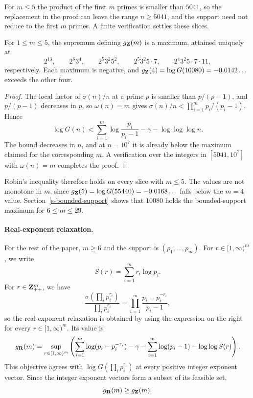 For \(m\leq5\) the product of the first \(m\) primes is smaller than
\(5041\), so the replacement in the proof can leave the range
\(n\geq5041\), and the support need not reduce to the first \(m\)
primes. A finite verification settles these slices.

\begin{proposition}
\label{prop-small-slices}
For \(1\leq m\leq5\), the supremum defining \(g_{\mathbf{Z}}(m)\) is a
maximum, attained uniquely at
\[
    2^{13},\qquad
    2^{6}3^{4},\qquad
    2^{5}3^{2}5^{2},\qquad
    2^{5}3^{2}5\cdot7,\qquad
    2^{4}3^{2}5\cdot7\cdot11,
\]
respectively. Each maximum is negative, and
\(g_{\mathbf{Z}}(4)=\log G(10080)=-0.0142\ldots\) exceeds the other
four.
\end{proposition}

\begin{proof}
The local factor of \(\sigma(n)/n\) at a prime \(p\) is smaller than
\(p/(p-1)\), and \(p/(p-1)\) decreases in \(p\), so \(\omega(n)=m\) gives
\(\sigma(n)/n<\prod_{i=1}^{m}p_i/(p_i-1)\). Hence
\[
    \log G(n)
    <
    \sum_{i=1}^{m}\log\frac{p_i}{p_i-1}
    -\gamma-\log\log\log n.
\]
The bound decreases in \(n\), and at \(n=10^7\) it is already below the
maximum claimed for the corresponding \(m\). A verification over the
integers in \([5041,10^7]\) with \(\omega(n)=m\) completes the proof.
\end{proof}

Robin's inequality therefore holds on every slice with \(m\leq5\). The
values are not monotone in \(m\), since
\(g_{\mathbf{Z}}(5)=\log G(55440)=-0.0168\ldots\) falls below the
\(m=4\) value. Section~\ref{s-bounded-support} shows that \(10080\)
holds the bounded-support maximum for \(6\leq m\leq29\).

\paragraph{Real-exponent relaxation.}
For the rest of the paper, \(m\geq6\) and the support is
\((p_1,\ldots,p_m)\). For \(r\in[1,\infty)^m\), we write
\[
    S(r)=\sum_{i=1}^{m}r_i\log p_i.
\]
For \(r\in\mathbf{Z}_{++}^{m}\), we have
\[
    \frac{\sigma(\prod_i p_i^{r_i})}
    {\prod_i p_i^{r_i}}
    =
    \prod_{i=1}^{m}
    \frac{p_i-p_i^{-r_i}}{p_i-1},
\]
so the real-exponent relaxation is obtained by using the expression on
the right for every \(r\in[1,\infty)^m\). Its value is
\begin{equation}
\label{e-objective}
    g_{\mathbf{R}}(m)
    =
    \sup_{r\in[1,\infty)^m}
    \left(
        \sum_{i=1}^{m}\log(p_i-p_i^{-r_i})
        -\gamma
        -\sum_{i=1}^{m}\log(p_i-1)
        -\log\log S(r)
    \right).
\end{equation}
This objective agrees with \(\log G(\prod_i p_i^{r_i})\) at every
positive integer exponent vector.
Since the integer exponent vectors form a subset of its feasible set,
\[
    g_{\mathbf{R}}(m)\geq g_{\mathbf{Z}}(m).
\]

